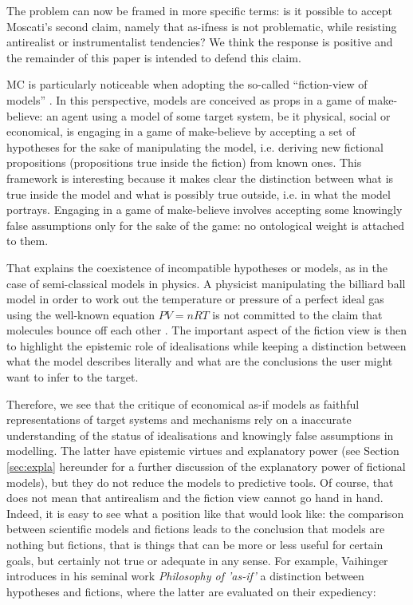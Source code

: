 \documentclass[a4paper,11pt]{article}
\theoremstyle{definition}
\begin{document}
The problem can now be framed in more specific terms: is it possible to accept Moscati's second claim, namely that as-ifness is not problematic, while resisting antirealist or instrumentalist tendencies? We think the response is positive and the remainder of this paper is intended to defend this claim.

MC is particularly noticeable when adopting the so-called ``fiction-view of models'' \citep{Frigg2016, Frigg2020, Toon2012}. In this perspective, models are conceived as props in a game of make-believe: an agent using a model of some target system, be it physical, social or economical, is engaging in a game of make-believe by accepting a set of hypotheses for the sake of manipulating the model, i.e. deriving new fictional propositions (propositions true inside the fiction) from known ones. This framework is interesting because it makes clear the distinction between what is true inside the model and what is possibly true outside, i.e. in what the model portrays. Engaging in a game of make-believe involves accepting some knowingly false assumptions only for the sake of the game: no ontological weight is attached to them.

That explains the coexistence of incompatible hypotheses or models, as in the case of semi-classical models in physics. A physicist manipulating the billiard ball model in order to work out the temperature or pressure of a perfect ideal gas using the well-known equation $PV=nRT$ is not committed to the claim that molecules bounce off each other {\color{red}{contre-sens ici non? pour dériver PV=nRT on suppose pas que les molecules sont des sphères qui tappent dedans, mais juste des points matériels qui ne rebondissent que sur les parois de la boite où est enfermé le gas. Donc on pourrait plutôt dire: "is not committed to the claim that molecules do not bounce off each other"}} . The important aspect of the fiction view is then to highlight the epistemic role of idealisations while keeping a distinction between what the model describes literally and what are the conclusions the user might want to infer to the target.

Therefore, we see that the critique of economical as-if models as faithful representations of target systems and mechanisms rely on a inaccurate understanding of the status of idealisations and knowingly false assumptions in modelling. The latter have epistemic virtues and explanatory power (see Section \ref{sec:expla} hereunder for a further discussion of the explanatory power of fictional models), but they do not reduce the models to predictive tools. Of course, that does not mean that antirealism and the fiction view cannot go hand in hand. Indeed, it is easy to see what a position like that would look like: the comparison between scientific models and fictions leads to the conclusion that models are nothing but fictions, that is things that can be more or less useful for certain goals, but certainly not true or adequate in any sense. For example, Vaihinger introduces in his seminal work \textit{Philosophy of 'as-if'} a distinction between hypotheses and fictions, where the latter are evaluated on their expediency:
\end{document}
